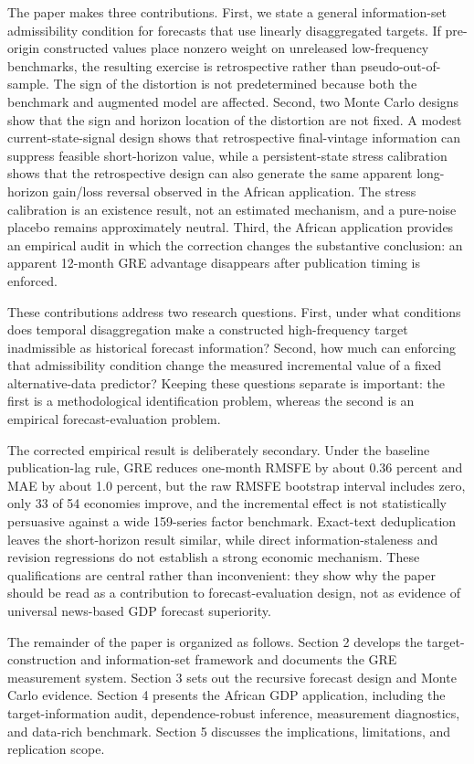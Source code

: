 \documentclass[preprint,12pt,authoryear]{elsarticle}
\begin{document}
The paper makes three contributions. First, we state a general information-set admissibility condition for forecasts that use linearly disaggregated targets. If pre-origin constructed values place nonzero weight on unreleased low-frequency benchmarks, the resulting exercise is retrospective rather than pseudo-out-of-sample. The sign of the distortion is not predetermined because both the benchmark and augmented model are affected. Second, two Monte Carlo designs show that the sign and horizon location of the distortion are not fixed. A modest current-state-signal design shows that retrospective final-vintage information can suppress feasible short-horizon value, while a persistent-state stress calibration shows that the retrospective design can also generate the same apparent long-horizon gain/loss reversal observed in the African application. The stress calibration is an existence result, not an estimated mechanism, and a pure-noise placebo remains approximately neutral. Third, the African application provides an empirical audit in which the correction changes the substantive conclusion: an apparent 12-month GRE advantage disappears after publication timing is enforced.

These contributions address two research questions. First, under what conditions does temporal disaggregation make a constructed high-frequency target inadmissible as historical forecast information? Second, how much can enforcing that admissibility condition change the measured incremental value of a fixed alternative-data predictor? Keeping these questions separate is important: the first is a methodological identification problem, whereas the second is an empirical forecast-evaluation problem.

The corrected empirical result is deliberately secondary. Under the baseline publication-lag rule, GRE reduces one-month RMSFE by about 0.36 percent and MAE by about 1.0 percent, but the raw RMSFE bootstrap interval includes zero, only 33 of 54 economies improve, and the incremental effect is not statistically persuasive against a wide 159-series factor benchmark. Exact-text deduplication leaves the short-horizon result similar, while direct information-staleness and revision regressions do not establish a strong economic mechanism. These qualifications are central rather than inconvenient: they show why the paper should be read as a contribution to forecast-evaluation design, not as evidence of universal news-based GDP forecast superiority.

The remainder of the paper is organized as follows. Section 2 develops the target-construction and information-set framework and documents the GRE measurement system. Section 3 sets out the recursive forecast design and Monte Carlo evidence. Section 4 presents the African GDP application, including the target-information audit, dependence-robust inference, measurement diagnostics, and data-rich benchmark. Section 5 discusses the implications, limitations, and replication scope.
\end{document}
